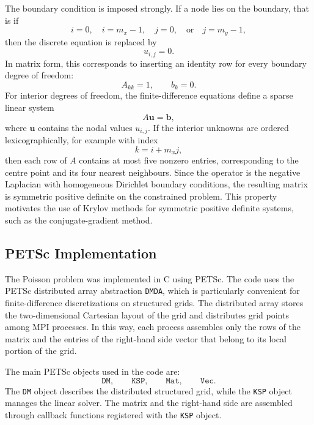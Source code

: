 \documentclass[unicode,10pt,a4paper,oneside,numbers=endperiod,openany]{scrartcl}
\begin{document}
The boundary condition is imposed strongly. If a node lies on the boundary,
that is if
\[
    i=0, \quad i=m_x-1, \quad j=0, \quad \text{or} \quad j=m_y-1,
\]
then the discrete equation is replaced by
\begin{equation*}
    u_{i,j} = 0.
\end{equation*}
In matrix form, this corresponds to inserting an identity row for every
boundary degree of freedom:
\begin{equation*}
    A_{kk}=1,
    \qquad
    b_k=0.
\end{equation*}
For interior degrees of freedom, the finite-difference equations define a sparse
linear system
\begin{equation*}
    A \mathbf{u} = \mathbf{b},
\label{eq:linear_system}
\end{equation*}
where \(\mathbf{u}\) contains the nodal values \(u_{i,j}\). If the interior
unknowns are ordered lexicographically, for example with index
\[
    k = i + m_x j,
\]
then each row of \(A\) contains at most five nonzero entries, corresponding to
the centre point and its four nearest neighbours. Since the operator is the
negative Laplacian with homogeneous Dirichlet boundary conditions, the resulting
matrix is symmetric positive definite on the constrained problem. This property
motivates the use of Krylov methods for symmetric positive definite systems,
such as the conjugate-gradient method.

\subsection{PETSc Implementation}

The Poisson problem was implemented in C using PETSc. The code uses the PETSc
distributed array abstraction \texttt{DMDA}, which is particularly convenient
for finite-difference discretizations on structured grids. The distributed array
stores the two-dimensional Cartesian layout of the grid and distributes grid
points among MPI processes. In this way, each process assembles only the rows of
the matrix and the entries of the right-hand side vector that belong to its
local portion of the grid.

The main PETSc objects used in the code are:
\[
    \texttt{DM}, \qquad \texttt{KSP}, \qquad \texttt{Mat}, \qquad \texttt{Vec}.
\]
The \texttt{DM} object describes the distributed structured grid, while the
\texttt{KSP} object manages the linear solver. The matrix and the right-hand
side are assembled through callback functions registered with the \texttt{KSP}
object.
\end{document}
